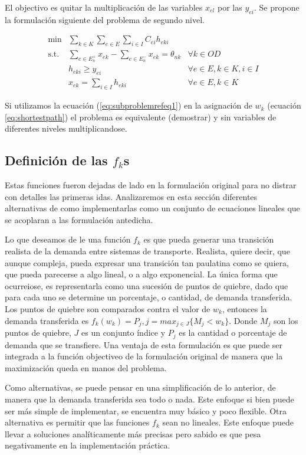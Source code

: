 \documentclass{article}
\begin{document}
  El objectivo es quitar la multiplicación de las variables $x_{el}$ por las $y_{ei}$. Se propone la formulación siguiente del problema de segundo nivel.

  \begin{align}
    \text{min}  & \sum_{k \in K} \sum_{e \in E} \sum_{i \in I} C_{ei} h_{eki}                     & \label{eq:subproblemrefeq1} \\
    \text{s.t.} & \sum_{e \in E_n^+} x_{ek} - \sum_{e \in E_n^-} x_{ek} = \theta_{nk} & \forall k \in OD \\
                & h_{eki} \geq y_{ei}                                              & \forall e \in E, k \in K, i \in I \\
                & x_{ek} = \sum_{i \in I} h_{eki}                                  & \forall e \in E, k \in K
  \end{align}

  Si utilizamos la ecuación (\ref{eq:subproblemrefeq1}) en la asignación de $w_k$ (ecuación \ref{eq:shortestpath}) el problema es equivalente (demostrar) y sin variables de diferentes niveles multiplicandose.

  \subsection*{Definición de las $f_k$s}

  Estas funciones fueron dejadas de lado en la formulación original para no distrar con detalles las primeras idas. Analizaremos en esta sección diferentes alternativas de como implementarlas como un conjunto de ecuaciones lineales que se acoplaran a las formulación antedicha.

  Lo que deseamos de le una función $f_k$ es que pueda generar una transición realista de la demanda entre sistemas de transporte. Realista, quiere decir, que aunque compleja, pueda expresar una transición tan paulatina como se quiera, que pueda parecerse a algo lineal, o a algo exponencial. La única forma que ocurreiose, es representarla como una sucesión de puntos de quiebre, dado que para cada uno se determine un porcentaje, o cantidad, de demanda transferida. Los puntos de quiebre son comparados contra el valor de $w_k$, entonces la demanda transferida es $f_k(w_k) = P_j, j = max_{j \in J} \{M_j < w_k\}$. Donde $M_j$ son los puntos de quiebre, $J$ es un conjunto índice y $P_j$ es la cantidad o porcentaje de demanda que se transfiere. Una ventaja de esta formulación es que puede ser integrada a la función objectiveo de la formulación original de manera que la maximización queda en manos del problema.

  Como alternativas, se puede pensar en una simplificación de lo anterior, de manera que la demanda transferida sea todo o nada. Este enfoque si bien puede ser más simple de implementar, se encuentra muy básico y poco flexible. Otra alternativa es permitir que las funciones $f_k$ sean no lineales. Este enfoque puede llevar a soluciones analíticamente más precisas pero sabido es que pesa negativamente en la implementación práctica.
\end{document}
